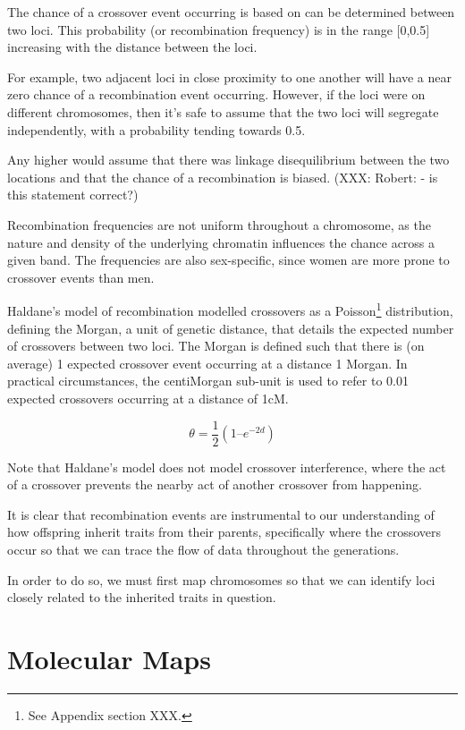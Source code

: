 The chance of a crossover event occurring is based on can be determined between two loci. This probability (or \gls{recombination  frequency}) is in the range [0,0.5] increasing with the distance between the loci.

For example,  two adjacent loci in close proximity to one another will have a near zero chance of a recombination event occurring. However, if the loci were on different chromosomes, then it's safe to assume that the two loci will segregate independently, with a probability tending towards 0.5.

Any higher would assume that there was \gls{linkage disequilibrium} between the two locations and that the chance of a recombination is biased. (XXX: Robert: - is this statement correct?)

Recombination frequencies are not uniform throughout a chromosome, as the nature and density of the underlying chromatin influences the chance across a given band. The frequencies are also sex-specific, since women are more prone to crossover events than men.

Haldane's model of recombination modelled crossovers as a Poisson\footnote{See Appendix section XXX.} distribution, defining the \gls{Morgan}, a unit of genetic distance, that details the expected number of crossovers between two loci. The Morgan is defined such that there is (on average) 1 expected crossover event occurring at a distance 1 Morgan.  In practical circumstances, the centiMorgan sub-unit is used to refer to 0.01 expected crossovers occurring at a distance of 1cM. 

\begin{equation}
\theta = \frac{1}{2} (1 –  e^{-2d})
\label{eqn:morgan}
\end{equation}

Note that Haldane’s model does not model \gls{crossover interference}, where the act of a crossover prevents the nearby act of another crossover from happening. 

It is clear that recombination events are instrumental to our understanding of how offspring inherit traits from their parents, specifically where the crossovers occur so that we can trace the flow of data throughout the generations.

In order to do so, we must first map chromosomes so that we can identify loci closely related to the inherited traits in question. 

\section{Molecular Maps}

